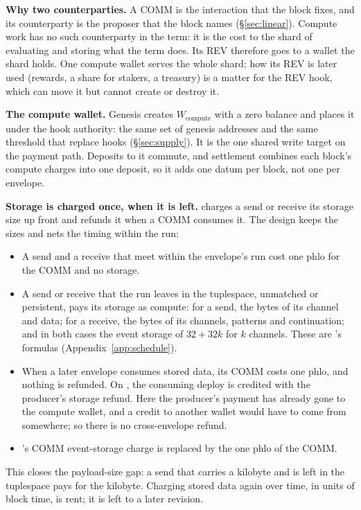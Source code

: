 \documentclass[11pt]{article}
\newcommand{\code}{\path}
\begin{document}
\textbf{Why two counterparties.} A COMM is the interaction that the block fixes, and its counterparty is the proposer that the block names (\S\ref{sec:linear}). Compute work has no such counterparty in the term: it is the cost to the shard of evaluating and storing what the term does. Its REV therefore goes to a wallet the shard holds. One compute wallet serves the whole shard; how its REV is later used (rewards, a share for stakers, a treasury) is a matter for the REV hook, which can move it but cannot create or destroy it.

\textbf{The compute wallet.} Genesis creates $W_{\mathrm{compute}}$ with a zero balance and places it under the hook authority: the same set of genesis addresses and the same threshold that replace hooks (\S\ref{sec:supply}). It is the one shared write target on the payment path. Deposits to it commute, and settlement combines each block's compute charges into one deposit, so it adds one datum per block, not one per envelope.

\textbf{Storage is charged once, when it is left.} \code{dev} charges a send or receive its storage size up front and refunds it when a COMM consumes it. The design keeps the sizes and nets the timing within the run:
\begin{itemize}
\item A send and a receive that meet within the envelope's run cost one phlo for the COMM and no storage.
\item A send or receive that the run leaves in the tuplespace, unmatched or persistent, pays its storage as compute: for a send, the bytes of its channel and data; for a receive, the bytes of its channels, patterns and continuation; and in both cases the event storage of $32 + 32k$ for $k$ channels. These are \code{dev}'s formulas (Appendix~\ref{app:schedule}).
\item When a later envelope consumes stored data, its COMM costs one phlo, and nothing is refunded. On \code{dev}, the consuming deploy is credited with the producer's storage refund. Here the producer's payment has already gone to the compute wallet, and a credit to another wallet would have to come from somewhere; so there is no cross-envelope refund.
\item \code{dev}'s COMM event-storage charge is replaced by the one phlo of the COMM.
\end{itemize}
This closes the payload-size gap: a send that carries a kilobyte and is left in the tuplespace pays for the kilobyte. Charging stored data again over time, in units of block time, is rent; it is left to a later revision.
\end{document}
